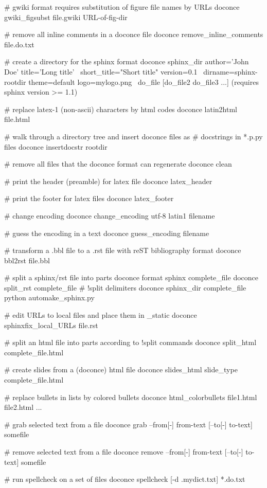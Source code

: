 \documentclass[%
oneside,                 %
final,                   %
10pt]{article}
\begin{document}
# gwiki format requires substitution of figure file names by URLs
doconce gwiki_figsubst file.gwiki URL-of-fig-dir

# remove all inline comments in a doconce file
doconce remove_inline_comments file.do.txt

# create a directory for the sphinx format
doconce sphinx_dir author='John Doe' title='Long title' \
    short_title="Short title" version=0.1 \
    dirname=sphinx-rootdir theme=default logo=mylogo.png \
    do_file [do_file2 do_file3 ...]
(requires sphinx version >= 1.1)

# replace latex-1 (non-ascii) characters by html codes
doconce latin2html file.html

# walk through a directory tree and insert doconce files as
# docstrings in *.p.py files
doconce insertdocstr rootdir

# remove all files that the doconce format can regenerate
doconce clean

# print the header (preamble) for latex file
doconce latex_header

# print the footer for latex files
doconce latex_footer

# change encoding
doconce change_encoding utf-8 latin1 filename

# guess the encoding in a text
doconce guess_encoding filename

# transform a .bbl file to a .rst file with reST bibliography format
doconce bbl2rst file.bbl

# split a sphinx/rst file into parts
doconce format sphinx complete_file
doconce split_rst complete_file        # !split delimiters
doconce sphinx_dir complete_file
python automake_sphinx.py

# edit URLs to local files and place them in _static
doconce sphinxfix_local_URLs file.rst

# split an html file into parts according to !split commands
doconce split_html complete_file.html

# create slides from a (doconce) html file
doconce slides_html slide_type complete_file.html

# replace bullets in lists by colored bullets
doconce html_colorbullets file1.html file2.html ...

# grab selected text from a file
doconce grab   --from[-] from-text [--to[-] to-text] somefile

# remove selected text from a file
doconce remove --from[-] from-text [--to[-] to-text] somefile

# run spellcheck on a set of files
doconce spellcheck [-d .mydict.txt] *.do.txt
\end{document}
